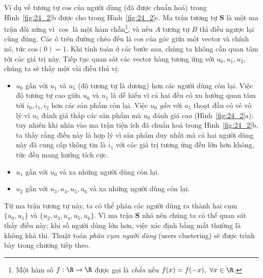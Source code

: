 Ví dụ về tương tự cos của người dùng (đã được chuẩn
hoá) trong Hình~\ref{fig:24_2}b được cho trong Hình~\ref{fig:24_2}c.
Ma trận tương tự $\mathbf{S}$ là
một ma trận đối xứng vì $\cos$ là một hàm chẵn\footnote{Một hàm số
$f:\R\rightarrow \R$ được gọi là \textit{chẵn} nếu $f(x) = f(-x),~\forall x \in
\R$.}, và nếu $A$ tương tự $B$ thì điều
ngược lại cũng đúng. Các ô trên đường chéo đều là
$\text{cos}$ của góc giữa một vector và chính nó, tức $\text{cos}(0) = 1$. Khi
tính toán ở các bước sau, chúng ta không cần quan tâm tới các giá trị này.
Tiếp tục quan sát các vector hàng tương ứng với $u_0, u_1, u_2$, chúng ta sẽ
thấy một vài điều thú vị:

\begin{itemize}
    \item $u_0$ {gần} với $u_1$ và $u_5$ (độ tương tự là dương) hơn các
    người dùng còn lại. Việc độ tương tự cao giữa $u_0$ và $u_1$ là
    dễ hiểu vì cả hai đều có xu hướng quan tâm tới $i_0, i_1, i_2$ hơn các
    sản phẩm còn lại. Việc $u_0$ \textit{gần} với $u_5$ thoạt đầu có vẻ vô
    lý vì $u_5$ đánh giá thấp các sản phẩm mà $u_0$ đánh giá cao
    (Hình~\ref{fig:24_2}a); tuy nhiên khi nhìn vào ma trận tiện ích đã chuẩn hoá
    trong Hình~\ref{fig:24_2}b, ta thấy rằng điều này là hợp lý vì sản phẩm duy
    nhất mà cả hai người dùng này đã cung cấp thông tin là $i_1$ với các giá
    trị tương ứng đều lớn hơn không, tức đều mang hướng tích cực.
     
    \item $u_1$ gần với $u_0$ và xa những người dùng còn lại.  
     
\item $u_2$ gần với $u_3, u_4, u_5, u_6$ và xa những người dùng còn lại.  
\end{itemize}
 
Từ ma trận tương tự này, ta có thể phân các người dùng ra thành hai cụm $\{u_0,
u_1\}$ và $\{u_2, u_3, u_4, u_5, u_6\}$. Vì ma trận $\mathbf{S}$ nhỏ nên chúng ta
có thể quan sát thấy điều này; khi số người dùng lớn hơn, việc xác định bằng mắt
thường là không khả thi. Thuật toán \textit{phân cụm người dùng} ({users
clustering}) sẽ được trình bày trong chương tiếp theo.
 
 
 
